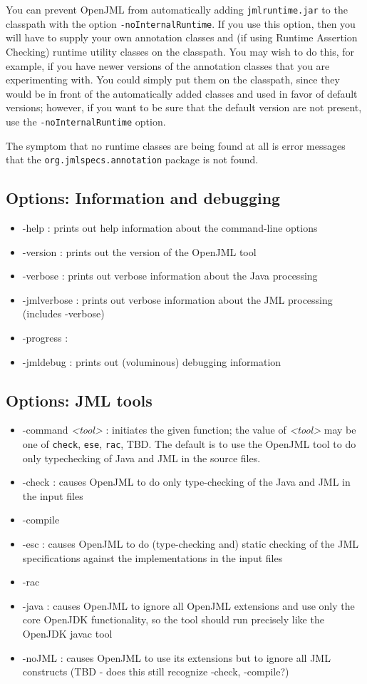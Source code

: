 \documentclass{report}%
\begin{document}
You can prevent OpenJML from automatically adding {\tt jmlruntime.jar} to the classpath with the
option {\tt -noInternalRuntime}. If you use this option, then you will have to supply your own
annotation classes and (if using Runtime Assertion Checking) runtime utility classes on the classpath. You may wish to do this, for example, if you have newer versions of the annotation
classes that you are experimenting with. You could simply put them on the classpath, since they
would be in front of the automatically added classes and used in favor of default versions;
however, if you want to be sure that the default version are not present, use the {\tt -noInternalRuntime} option.

The symptom that no runtime classes are being found at all is error messages that 
the {\tt org.jmlspecs.annotation} package is not found.

\subsection{Options: Information and debugging}
\begin{itemize}
\item -help : prints out help information about the command-line options
\item -version : prints out the version of the OpenJML tool
\item -verbose : prints out verbose information about the Java processing
\item -jmlverbose : prints out verbose information about the JML processing (includes -verbose)
\item -progress :
\item -jmldebug : prints out (voluminous) debugging information
\end{itemize}

\subsection{Options: JML tools}
\begin{itemize}
\item -command {\it <tool>} : initiates the given function; the value of {\it <tool>} may be one of {\tt check}, {\tt ese}, {\tt rac}, TBD.
The default is to use the OpenJML tool to do only typechecking of Java and JML in the source files. 
\item -check : causes OpenJML to do only type-checking of the Java and JML in the input files
\item -compile
\item -esc : causes OpenJML to do (type-checking and) static checking of the JML specifications against the implementations in the input files
\item -rac
\item -java : causes OpenJML to ignore all OpenJML extensions and use only the core OpenJDK functionality, so the tool should run precisely like the OpenJDK javac tool
\item -noJML : causes OpenJML to use its extensions but to ignore all JML constructs (TBD - does this still recognize -check, -compile?)
\end{itemize}
\end{document}
